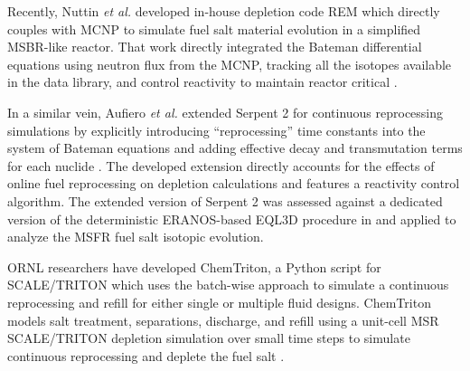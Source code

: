 Recently, Nuttin \emph{et al.} developed in-house depletion code REM which 
directly couples with \gls{MCNP} \cite{noauthor_mcnp_2004} to simulate fuel 
salt material evolution in a simplified \gls{MSBR}-like reactor. That work 
directly integrated the Bateman differential equations using neutron flux from 
the \gls{MCNP}, tracking all the isotopes available in the data library, and 
control reactivity to maintain reactor critical \cite{nuttin_potential_2005}.

In a similar vein, Aufiero \emph{et al.} extended Serpent 2 for continuous 
reprocessing simulations by explicitly introducing ``reprocessing'' time 
constants into the system of Bateman equations and adding effective decay and 
transmutation terms for each nuclide \cite{aufiero_extended_2013}. The 
developed extension directly accounts for the effects of online fuel 
reprocessing on depletion calculations and features a reactivity control 
algorithm. The extended version of Serpent 2 was assessed against a dedicated 
version of the deterministic ERANOS-based EQL3D procedure in 
\cite{fiorina_investigation_2013} and applied to analyze the \gls{MSFR} fuel 
salt isotopic evolution.

\gls{ORNL} researchers have developed ChemTriton, a Python script for
SCALE/TRITON which uses the batch-wise approach to simulate a continuous 
reprocessing and refill for either single or multiple fluid designs. 
ChemTriton models salt treatment, separations, discharge, and refill using a 
unit-cell MSR SCALE/TRITON depletion simulation over small time steps to 
simulate continuous reprocessing and deplete the fuel salt 
\cite{powers_new_2013, betzler_fuel_2018}.

